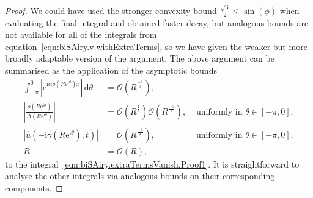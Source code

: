 \documentclass[10pt,a4paper]{amsart}
\newcommand{\D}{\ensuremath{\,\mathrm{d}}}
\newcommand{\abs}[1]{\left\lvert#1\right\rvert}
\providecommand{\bigoh}[1]{\mathcal{O}\left(#1\right)}
\renewcommand{\leq}{\leqslant}
\newcommand{\re}{\ensuremath{\mathrm{e}}}
\newcommand{\ri}{\ensuremath{\mathrm{i}}}
\begin{document}
\begin{proof}
  We could have used the stronger convexity bound $\frac{\sqrt3}2\leq\sin(\phi)$ when evaluating the final integral and obtained faster decay, but analogous bounds are not available for all of the integrals from equation~\eqref{eqn:biSAiry.v.withExtraTerms}, so we have given the weaker but more broadly adaptable version of the argument.
  The above argument can be summarised as the application of the asymptotic bounds
  \begin{align*}
    \int_{-\pi}^0 \abs{\re^{\ri\alpha\rho\left(R\re^{\ri\theta}\right)x}} \D\theta &= \bigoh{R^{\frac{-1}3}}, \\
    \abs{\frac{\rho\left(R\re^{\ri\theta}\right)}{\Delta\left(R\re^{\ri\theta}\right)}} &= \bigoh{R^{\frac13}}\bigoh{R^{\frac{-5}4}},
    & \mbox{ uniformly in } \theta\in[-\pi,0], \\
    \abs{\widehat u\left(-\ri\gamma\left(R\re^{\ri\theta}\right),t\right)} &= \bigoh{R^{\frac{-1}4}},
    & \mbox{ uniformly in } \theta\in[-\pi,0], \\
    R &= \bigoh{R},
  \end{align*}
  to the integral~\eqref{eqn:biSAiry.extraTermsVanish.Proof1}.
  It is straightforward to analyse the other integrals via analogous bounds on their corresponding components.
\end{proof}
\end{document}
